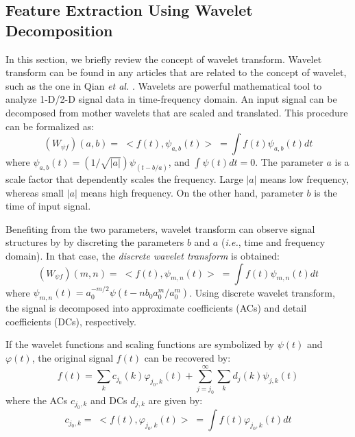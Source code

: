 \documentclass{ws-ijwmip}
\begin{document}
\subsection{Feature Extraction Using Wavelet Decomposition}
In this section, we briefly review the concept of wavelet transform.
Wavelet transform can be found in any articles that are related to the concept of wavelet, such as the one in Qian \textit{et al.} \cite{29}. 
Wavelets are powerful mathematical tool to analyze 1-D/2-D signal data in time-frequency domain.
An input signal can be decomposed from mother wavelets that are scaled and translated. 
This procedure can be formalized as: %
\begin{equation}
(W_{\psi f})(a,b) = \;<f(t),\psi _{a,b} (t)>\; = \int f(t)\psi _{a,b} (t)dt
\label{equ2.1}
\end{equation}
where $\psi_{a,b}(t) = (1/\sqrt{|a|})\psi_{(t-b/{a})}$, and $\int \psi (t)dt=0$. 
The parameter $a$ is a scale factor that dependently scales the frequency.
Large $| a |$ means low frequency, whereas small $| a|$ means high frequency.
On the other hand, parameter $b$ is the time of input signal. 


Benefiting from the two parameters, wavelet transform can observe signal structures by by discreting the parameters $b$ and $a$ (\textit{i.e.}, time and frequency domain).
In that case, the \emph{discrete wavelet transform} is obtained:
\begin{equation}
(W_{\psi f})(m,n) 
=\; < f(t),\psi _{m,n}(t)>\; = \int f(t)\psi _{m,n}(t)dt
\label{equ2.2}
\end{equation}
where $\psi _{m,n}(t)=a_{0}^{-m/2}\psi (t-n{b_0}{a _{0}^{m}}/{a _{0}^{m}})$.
Using discrete wavelet transform, the signal is decomposed into approximate coefficients (ACs) and detail coefficients (DCs), respectively. 

If the wavelet functions and scaling functions are symbolized by $\psi(t)$ and $\varphi(t)$, the original signal $f(t)$ can be recovered by:
\begin{equation}
f(t)=\sum _k c_{j_0}(k)\varphi _{j_0,k}(t) + \sum_{j=j_0}^{\infty }\sum _k d_j(k)\psi _{j,k}(t)
\label{equ2.3}
\end{equation}
where the ACs $c_{j_0,k}$ and DCs $d_{j,k}$ are given by:
\begin{equation}
c_{j_0,k} =\; < f(t),\varphi _{j_0,k}(t)>\; =\int f(t) \varphi _{j_0,k}(t)dt
\label{equ2.4}
\end{equation}
\end{document}
